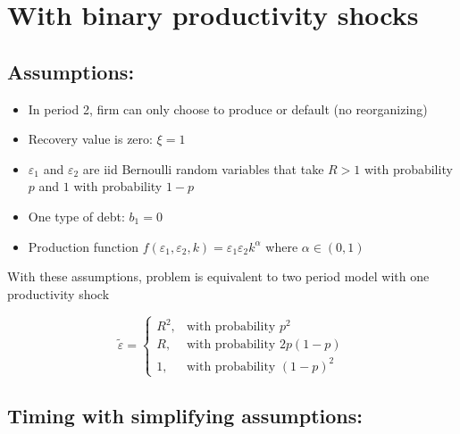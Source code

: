 \documentclass{article}
\begin{document}
\pagebreak

\section*{With binary productivity shocks}

\subsection*{Assumptions:}

\begin{itemize}
\item In period 2, firm can only choose to produce or default (no reorganizing)
\item Recovery value is zero: $\xi = 1$
\item $\varepsilon_1$ and $\varepsilon_2$ are iid Bernoulli random variables that take $R > 1$ with probability $p$ and $1$ with probability $1 - p$
\item One type of debt: $b_1 = 0$
\item Production function $f(\varepsilon_1,\varepsilon_2, k) = \varepsilon_1\varepsilon_2k^\alpha$ where $\alpha \in (0,1)$
\end{itemize}

With these assumptions, problem is equivalent to two period model with one productivity shock 

$$
\tilde \varepsilon = 
\begin{cases} 
R^2, & \text{with probability } p^2\\
R, & \text{with probability } 2p(1-p)\\
1, & \text{with probability } (1-p)^2
\end{cases}
$$

\smallskip

\subsection*{Timing with simplifying assumptions:}
\end{document}

